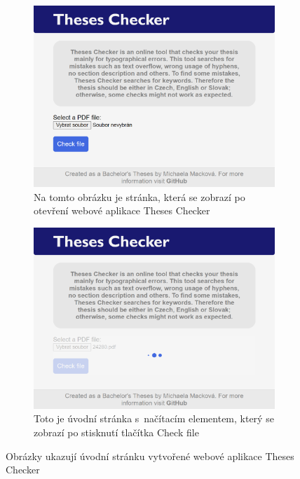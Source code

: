 \begin{figure}[H]
    
    \begin{subfigure}[b]{0.496\linewidth}
        \includegraphics[width=\linewidth]{obrazky-figures/screenshot-page1-small.png}
        \caption{Na tomto obrázku je stránka, která se zobrazí po otevření webové aplikace Theses Checker}
        \label{pic_theses_checker_page1_sub1}
    \end{subfigure}
    \hfill
    \begin{subfigure}[b]{0.496\linewidth}
        \includegraphics[width=\linewidth]{obrazky-figures/screenshot-loading-small.png}
        \caption{Toto je úvodní stránka s~načítacím elementem, který se zobrazí po stisknutí tlačítka Check file}
        \label{pic_theses_checker_page1_sub2}
    \end{subfigure}
    \caption[]{Obrázky ukazují úvodní stránku vytvořené webové aplikace Theses Checker}
    \label{pic_theses_checker_page1}
\end{figure}

